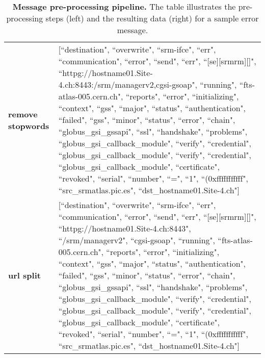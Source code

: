 \begin{table}
\begin{tabular}{p{1.9cm} | p{12cm}}
\textbf{remove stopwords} &
  {[}``destination", ``overwrite", ``srm-ifce", ``err", ``communication", ``error", ``send", ``err", ``{[}se{]}{[}srmrm{]}{[}{]}", ``httpg://hostname01.Site-4.ch:8443:/srm/managerv2,cgsi-gsoap", ``running", ``fts-atlas-005.cern.ch", ``reports", ``error", ``initializing", ``context", ``gss", ``major", ``status", ``authentication", ``failed", ``gss", ``minor", ``status", ``error", ``chain", ``globus\_gsi\_gssapi", ``ssl", ``handshake", ``problems", ``globus\_gsi\_callback\_module", ``verify", ``credential", ``globus\_gsi\_callback\_module", ``verify", ``credential", ``globus\_gsi\_callback\_module", ``certificate", ``revoked", ``serial", ``number", ``=", ``1", ``(0xfffffffffff", ``src\_srmatlas.pic.es", ``dst\_hostname01.Site-4.ch"{]} \\[0.2cm]
\textbf{url split} &
  {[}``destination", ``overwrite", ``srm-ifce", ``err", ``communication", ``error", ``send", ``err", ``{[}se{]}{[}srmrm{]}{[}{]}", ``httpg://hostname01.Site-4.ch:8443", ``/srm/managerv2", ``cgsi-gsoap", ``running", ``fts-atlas-005.cern.ch", ``reports", ``error", ``initializing", ``context", ``gss", ``major", ``status", ``authentication", ``failed", ``gss", ``minor", ``status", ``error", ``chain", ``globus\_gsi\_gssapi", ``ssl", ``handshake", ``problems", ``globus\_gsi\_callback\_module", ``verify", ``credential", ``globus\_gsi\_callback\_module", ``verify", ``credential", ``globus\_gsi\_callback\_module", ``certificate", ``revoked", ``serial", ``number", ``=", ``1", ``(0xfffffffffff", ``src\_srmatlas.pic.es", ``dst\_hostname01.Site-4.ch"{]}
\end{tabular}
\caption{\textbf{Message pre-processing pipeline.} The table illustrates the \mbox{pre-processing} steps (left) and the resulting data (right) for a sample error message.}
\label{tab:preproc-pipeline}
\end{table}


